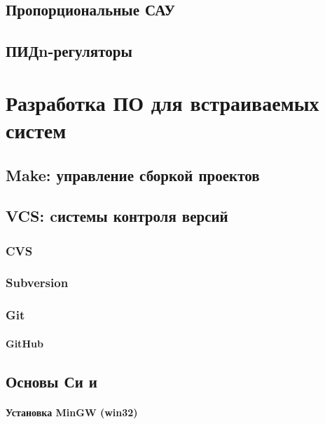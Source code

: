 \chapter{Пропорциональные САУ}

\chapter{ПИДn-регуляторы}

\part{Разработка ПО для встраиваемых систем}



\chapter{Make: управление сборкой проектов}\label{make}

\chapter{VCS: cистемы контроля версий}\label{vcs}

\section{CVS}

\section{Subversion}

\section{Git}

\subsection{GitHub}

\chapter{Основы Си и \cpp}

\subsection{Установка MinGW (win32)}

